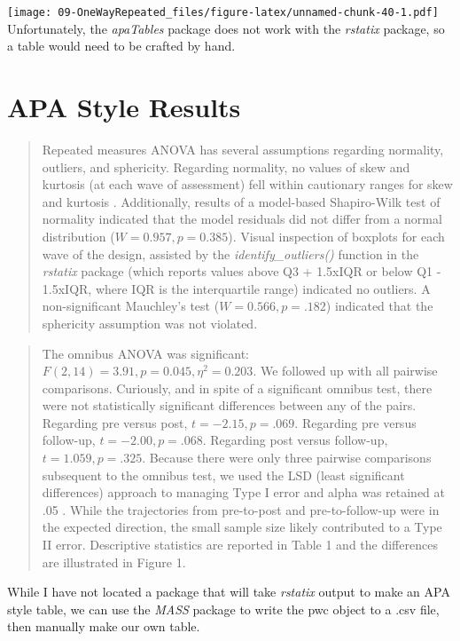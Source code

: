 \documentclass[
  11pt,
]{book}
\begin{document}
\texttt{[image: 09-OneWayRepeated\_files/figure-latex/unnamed-chunk-40-1.pdf]} Unfortunately, the \emph{apaTables} package does not work with the \emph{rstatix} package, so a table would need to be crafted by hand.

\hypertarget{apa-style-results-5}{%
\section{APA Style Results}\label{apa-style-results-5}}

\begin{quote}
Repeated measures ANOVA has several assumptions regarding normality, outliers, and sphericity. Regarding normality, no values of skew and kurtosis (at each wave of assessment) fell within cautionary ranges for skew and kurtosis \citep{kline_data_2016}. Additionally, results of a model-based Shapiro-Wilk test of normality indicated that the model residuals did not differ from a normal distribution (\(W = 0.957, p = 0.385\)). Visual inspection of boxplots for each wave of the design, assisted by the \emph{identify\_outliers()} function in the \emph{rstatix} package (which reports values above Q3 + 1.5xIQR or below Q1 - 1.5xIQR, where IQR is the interquartile range) indicated no outliers. A non-significant Mauchley's test (\(W = 0.566, p = .182\)) indicated that the sphericity assumption was not violated.
\end{quote}

\begin{quote}
The omnibus ANOVA was significant: \(F(2,14) = 3.91, p = 0.045, \eta^2 = 0.203\). We followed up with all pairwise comparisons. Curiously, and in spite of a significant omnibus test, there were not statistically significant differences between any of the pairs. Regarding pre versus post, \(t = -2.15, p= .069\). Regarding pre versus follow-up, \(t = -2.00, p = .068\). Regarding post versus follow-up, \(t = 1.059, p = .325\). Because there were only three pairwise comparisons subsequent to the omnibus test, we used the LSD (least significant differences) approach to managing Type I error and alpha was retained at .05 \citep{green_using_2017}. While the trajectories from pre-to-post and pre-to-follow-up were in the expected direction, the small sample size likely contributed to a Type II error. Descriptive statistics are reported in Table 1 and the differences are illustrated in Figure 1.
\end{quote}

While I have not located a package that will take \emph{rstatix} output to make an APA style table, we can use the \emph{MASS} package to write the pwc object to a .csv file, then manually make our own table.
\end{document}
